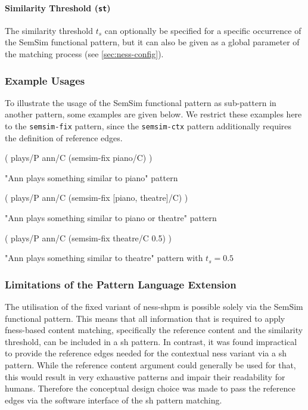 \documentclass[11pt, numbers=noenddot]{scrreprt}
\begin{document}
\paragraph{Similarity Threshold (\texttt{\gls{st}})}
The similarity threshold \(t_s\) can optionally be specified for a specific occurrence of the SemSim functional pattern, but it can also be given as a global parameter of the matching process (see \cref{sec:ness-config}). 

\subsubsection{Example Usages}
\label{sec:semsim-pattern-example-usages}

To illustrate the usage of the SemSim functional pattern as sub-pattern in another pattern, some examples are given below. We restrict these examples here to the \texttt{semsim-fix} pattern, since the \texttt{semsim-ctx} pattern additionally requires the definition of reference edges.

\begin{pattern}[h!]
  \normalfont\sffamily
  \centering
  ( plays/P ann/C (semsim-fix piano/C) )
  \caption{"Ann plays something similar to piano" pattern}
\end{pattern}

\begin{pattern}[h!]
  \normalfont\sffamily
  \centering
  ( plays/P ann/C (semsim-fix [piano, theatre]/C) )
  \caption{"Ann plays something similar to piano or theatre" pattern}
\end{pattern}


\begin{pattern}[h!]
  \normalfont\sffamily
  \centering
  ( plays/P ann/C (semsim-fix theatre/C 0.5) )
  \caption{"Ann plays something similar to theatre" pattern with \(t_s = 0.5\)}
\end{pattern}


\subsubsection{Limitations of the Pattern Language Extension}
\label{sec:pl-extension-limitations}
The utilisation of the fixed variant of \gls{ness-shpm} is possible solely via the SemSim functional pattern. This means that all information that is required to apply \gls{fness}-based content matching, specifically the reference content and the similarity threshold, can be included in a \gls{sh} pattern. In contrast, it was found impractical to provide the reference edges needed for the contextual \gls{ness} variant via a \gls{sh} pattern. While the reference content argument could generally be used for that, this would result in very exhaustive patterns and impair their readability for humans. Therefore the conceptual design choice was made to pass the reference edges via the software interface of the \gls{sh} pattern matching.
\end{document}

